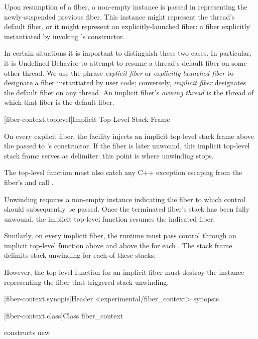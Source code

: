 Upon resumption of a fiber, a non-empty \fiber instance is passed in
representing the newly-suspended previous fiber. This \fiber instance might
represent the thread's default fiber, or it might represent an
explicitly-launched fiber: a fiber explicitly instantiated by
invoking \fiber's constructor.

In certain situations it is important to distinguish these two cases. In
particular, it is Undefined Behavior to attempt to resume a thread's default
fiber on some other thread. We use the phrase \emph{explicit fiber}
or \emph{explicitly-launched fiber} to designate a fiber instantiated by user
code; conversely, \emph{implicit fiber} designates the default fiber on any
thread. An implicit fiber's \emph{owning thread} is the thread of which that
fiber is the default fiber.

[fiber-context.toplevel]{Implicit Top-Level Stack Frame}

On every explicit fiber, the facility injects an implicit top-level stack
frame above the \entryfn passed to \fiber's constructor. If the fiber is later
unwound, this implicit top-level stack frame serves as delimiter: this point
is where unwinding stops.

The top-level function must also catch any C++ exception escaping from the
fiber's \entryfn and call .

Unwinding requires a non-empty \fiber instance indicating the fiber to which
control should subsequently be passed. Once the terminated fiber's stack has
been fully unwound, the implicit top-level function resumes the indicated fiber.

Similarly, on every implicit fiber, the runtime must pass control through an
implicit top-level function above \main and above the \entryfn for
each \thread. The stack frame delimits stack unwinding for each of these
stacks. 

However, the top-level function for an implicit fiber must destroy
the \fiber instance representing the fiber that triggered stack unwinding.

[fiber-context.synopis]{Header <experimental/fiber\_context> synopsis}


[fiber-context.class]{Class fiber\_context}


constructs new 


